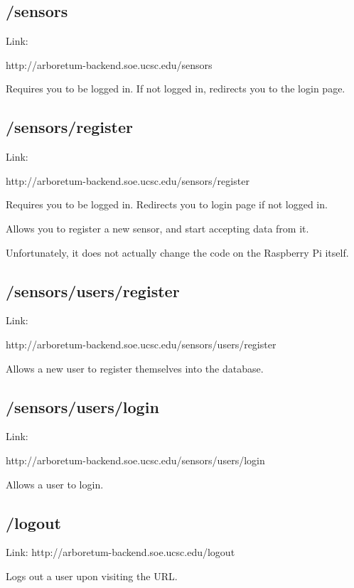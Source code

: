 \subsection{/sensors}\label{sensors}

Link:

http://arboretum-backend.soe.ucsc.edu/sensors

Requires you to be logged in. If not logged in, redirects you to the
login page.

\subsection{/sensors/register}\label{sensorsregister}

Link:

http://arboretum-backend.soe.ucsc.edu/sensors/register

Requires you to be logged in. Redirects you to login page if not logged
in.

Allows you to register a new sensor, and start accepting data from it.

Unfortunately, it does not actually change the code on the Raspberry Pi
itself.

\subsection{/sensors/users/register}\label{sensorsusersregister}

Link:

http://arboretum-backend.soe.ucsc.edu/sensors/users/register

Allows a new user to register themselves into the database.

\subsection{/sensors/users/login}\label{sensorsuserslogin}

Link:

http://arboretum-backend.soe.ucsc.edu/sensors/users/login

Allows a user to login.

\subsection{/logout}\label{logout}

Link: http://arboretum-backend.soe.ucsc.edu/logout

Logs out a user upon visiting the URL.

